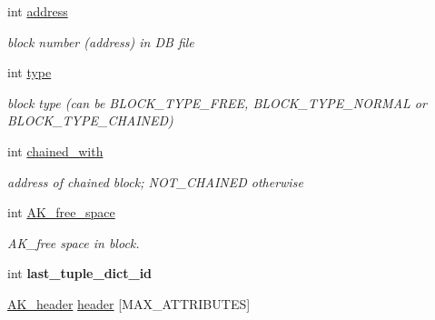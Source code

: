 \begin{DoxyCompactItemize}
\item 
int \hyperlink{structAK__block_a72691b8b4db638181adadd02c0a9c6af}{address}\hypertarget{structAK__block_a72691b8b4db638181adadd02c0a9c6af}{}\label{structAK__block_a72691b8b4db638181adadd02c0a9c6af}

\begin{DoxyCompactList}\small\item\em block number (address) in DB file \end{DoxyCompactList}\item 
int \hyperlink{structAK__block_a7bc611836789dc2b045d768432efe184}{type}\hypertarget{structAK__block_a7bc611836789dc2b045d768432efe184}{}\label{structAK__block_a7bc611836789dc2b045d768432efe184}

\begin{DoxyCompactList}\small\item\em block type (can be B\+L\+O\+C\+K\+\_\+\+T\+Y\+P\+E\+\_\+\+F\+R\+EE, B\+L\+O\+C\+K\+\_\+\+T\+Y\+P\+E\+\_\+\+N\+O\+R\+M\+AL or B\+L\+O\+C\+K\+\_\+\+T\+Y\+P\+E\+\_\+\+C\+H\+A\+I\+N\+ED) \end{DoxyCompactList}\item 
int \hyperlink{structAK__block_a56692ada02b24c08e3be44da8504ad9b}{chained\+\_\+with}\hypertarget{structAK__block_a56692ada02b24c08e3be44da8504ad9b}{}\label{structAK__block_a56692ada02b24c08e3be44da8504ad9b}

\begin{DoxyCompactList}\small\item\em address of chained block; N\+O\+T\+\_\+\+C\+H\+A\+I\+N\+ED otherwise \end{DoxyCompactList}\item 
int \hyperlink{structAK__block_a5f3394eebe71ffc105b8f52af2155102}{A\+K\+\_\+free\+\_\+space}\hypertarget{structAK__block_a5f3394eebe71ffc105b8f52af2155102}{}\label{structAK__block_a5f3394eebe71ffc105b8f52af2155102}

\begin{DoxyCompactList}\small\item\em A\+K\+\_\+free space in block. \end{DoxyCompactList}\item 
int {\bfseries last\+\_\+tuple\+\_\+dict\+\_\+id}\hypertarget{structAK__block_a6dcee13f6c5c80530ae1376e0f3a399f}{}\label{structAK__block_a6dcee13f6c5c80530ae1376e0f3a399f}

\item 
\hyperlink{structAK__header}{A\+K\+\_\+header} \hyperlink{structAK__block_a291a49ea3dc9d972d3e1da46ba620903}{header} \mbox{[}M\+A\+X\+\_\+\+A\+T\+T\+R\+I\+B\+U\+T\+ES\mbox{]}\hypertarget{structAK__block_a291a49ea3dc9d972d3e1da46ba620903}{}\label{structAK__block_a291a49ea3dc9d972d3e1da46ba620903}


\end{DoxyCompactItemize}
